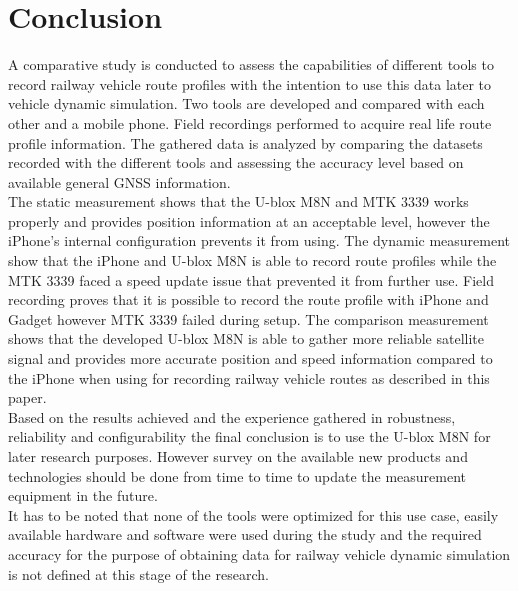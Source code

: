 \documentclass{article}
\begin{document}
	\section{Conclusion}
		A comparative study is conducted to assess the capabilities of different tools to record railway vehicle route profiles with the intention to use this data later to vehicle dynamic simulation. Two tools are developed and compared with each other and a mobile phone. Field recordings performed to acquire real life route profile information. The gathered data is analyzed by comparing the datasets recorded with the different tools and assessing the accuracy level based on available general GNSS information. \\
		The static measurement shows that the U-blox M8N and MTK 3339 works properly and provides position information at an acceptable level, however the iPhone's internal configuration prevents it from using. The dynamic measurement show that the iPhone and U-blox M8N is able to record route profiles while the MTK 3339 faced a speed update issue that prevented it from further use. Field recording proves that it is possible to record the route profile with iPhone and Gadget however MTK 3339 failed during setup. The comparison measurement shows that the developed U-blox M8N is able to gather more reliable satellite signal and provides more accurate position and speed information compared to the iPhone when using for recording railway vehicle routes as described in this paper. \\
		Based on the results achieved and the experience gathered in robustness, reliability and configurability the final conclusion is to use the U-blox M8N for later research purposes. However survey on the available new products and technologies should be done from time to time to update the measurement equipment in the future. \\
		It has to be noted that none of the tools were optimized for this use case, easily available hardware and software were used during the study and the required accuracy for the purpose of obtaining data for railway vehicle dynamic simulation is not defined at this stage of the research.
	\newpage
	\printbibliography
\end{document}

